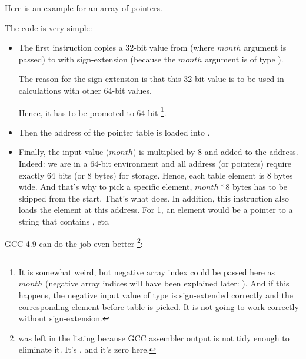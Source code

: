 ﻿
\label{array_of_pointers_to_strings}

Here is an example for an array of pointers.






The code is very simple:

\begin{itemize}

\item
{}

The first  instruction copies a 32-bit value from \ECX (where $month$ argument is passed) 
to \RAX with sign-extension (because the $month$ argument is of type \Tint).

The reason for the sign extension is that this 32-bit value is to be used in calculations
with other 64-bit values.

Hence, it has to be promoted to 64-bit%
\footnote{It is somewhat weird, but negative array index could be passed here as $month$
(negative array indices will have been explained later: ).
And if this happens, the negative input value of \Tint type is sign-extended correctly 
and the corresponding element before table is picked. 
It is not going to work correctly without sign-extension.}.

\item
Then the address of the pointer table is loaded into \RCX.

\item
Finally, the input value ($month$) is multiplied by 8 and added to the address.
Indeed: we are in a 64-bit environment and all address (or pointers) require exactly 64 bits (or 8 bytes) 
for storage.
Hence, each table element is 8 bytes wide.
And that's why to pick a specific element, $month*8$ bytes has to be skipped from the start.
That's what \MOV does.
In addition, this instruction also loads the element at this address.
For 1, an element would be a pointer to a string that contains , etc.

\end{itemize}

\Optimizing GCC 4.9 can do the job even better
\footnote{ was left in the listing because GCC assembler output is not tidy enough to eliminate it.
It's , and it's zero here.}:

